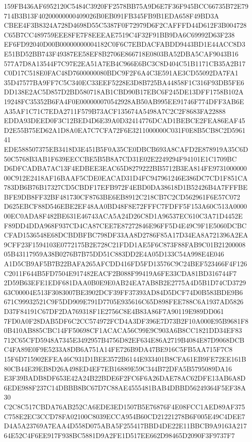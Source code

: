 \documentclass[UTF8,fontset=fandol,zihao=-4,a4paper]{ctexart}
\begin{document}
{{159FB436AF6952120C5484C3920FF2578BB75A9D6E7F36F945BCC66735B72E79714B3B13F40200000000409026B0EB091FB345FB9B1EDA658F49BD3A
CBEE4F3B8324A728D4698D55C5387F0F72979D6F2CAFFFD44D612F3B004728C65B7CC489759EEE8FE7F8EEEAE7519C4F32F91BB9DA6C69992D63F238
EF6FD92040D00B00000000004182C0F6C7EBDACFABDD9443BD1E44ACC8D3E51BD52BB743F49387EE58EF8B2706E866718E0803BA52DBA5CAF9043B16
577A7D8A13544F7C97E2EA51A7EB4C966E6BC3C8D404C51B1171CB35A2B17C0D17C518E0FAC48D7600000080BDC9F2F6A4C3E591AE3CD55092DA7FA1
35D47577BA9FF7C5C340EC33EEF5228E3D8B725BA44858F1C316F93DB5FE6DD138E2AC5D857D2BD580718AB1CBD90B17EBC6F245DE13DFF1758B102A
19248FC35352B6FA4F0E000000070542928AB50AB995EE91746F774DFF3AB6EA35AF1C71C7EDA2711F579B73ACF135674A5498A7C2C2F8683FA22888
EDDA93DEED0F3C12BED4D6E39A0D32414776DCAD1BEBCE2FEA86EAF45D2E55B75ED62A1D8A0EA7C7CFA72F6E3211000000C031F0E8B5CB8C2D596141
EDE588507375EB3418D3E451B5F0A35CE0DBCB693A8CAFD2E878919A35C6D50C5768B3AB1F639EECCBE5B5B8A7CD31E02E2249294F94101E1C1709BC
D6DFCADBA7AC13F4EDBEE3EAC65D8279222BB5712B3EA814FE973100000000C912E2418AF16BAAF5CDE0EACAD31D4FC947961246E386DC7CD1F851CA
783DB6B76B17327CD5CBDF17EFB972F4EBD0DA38618D1B52426B4A7FFFBEBFE9DB8FF32BF481730CF8763BE6EB8912C218CB7C2CD562961F6E57C072
D625EBCF88D546EBE2EF48AA0BD48F8E72FFFC7FDFF5F153A60C513A000000EC0ADA8F482BE631E46743ACA5A24D26C8D1A96537EC610C3A71D4452E
F89DD4DDA968F937CD4CA87CEE7E87272846E96FF5D4E49C9F1E5060DCBCCFAD1536548E68DCBDBFBC798DF33AA8D2786F85A17D34EA8A721396A2EA
9CFF23F1594103E0772175B2E728C21FDD1AE5F6C873F88FAB9C01B2120000805B43117959A38B0276B7B75DD51C883DD2E4A05D133C54A998E4E046
A1D5CB9AF5B7B22BAFA265AFCDD416FD5FD13576C9C24BEF523466F4F126C2011F644B5FD7504E917482EACF2B088F99419A6FE33CDA81BD316744F7
2D59B63EFE1EDF681DAA0B0E9E0AB24EA7AB8B2E2775A4D5B1D74CD372963C00004E513F3083007BE3902DCF39FF37393AD84D5DCF74D0B583BDE9B6
671C99932521C9F5DD909E791D7705E935616C65D898FEE788C6A1937AD5826D37F84191C67DF2DA769318F1E2756C8E4B83A86F7A90119E989DD061
7FD0A0F28DAB5DF6C2CC574972FCD4A3DF396E7D73B2F10A000E95B9681F80B410AB885CBC14FF50698CF1ACACA56C99E9C903A6B8CC1821DD34EF83
712C65CFD5948A7345E3492957B4756D82EF634E86A2719B4084E87D9068DCBC4FA89E0F9E5233A8DB6A751A14FE726B9DA47BE916C5FB5AA715F7C8
15F6D715902EFEA46C931D1BEE3572B6144E933401B8CFA61EB9FE72EE161B80CB44E39EB8D26A498ED4EF7EB16889E59C344B72DFA5B5795089DA16
E3F39BADB8DF653E42A24B22BDE6F2FC6F6A26DAE78AC62DFE13AB6A8D6EDE988F237C14DBBB8BC67D7C88AE4555481BAB4DBBD56249364F5EF38A30
C2C8C517CBDA76AB252CA6EDE3ED1507B5E76876F4E08FCC1AED89AF375C758E2EC3CCD78FA02100C8039ECCA954B60CD21221278B6F005E49C4DEE7
D4A5A23769A7EAA4D558D075ABA5F255417BBD4DE22E11BBCB9A9163A21764E52C4F6EE917F938BC5881D9A2FE1D517EE662D98465D2090F3F9737F7
}}
\end{document}
